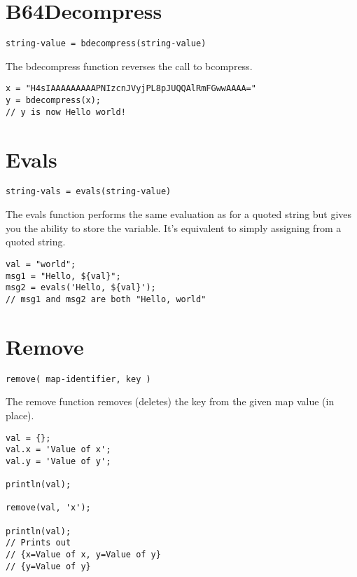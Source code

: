 \section{B64Decompress}
\begin{Verbatim}
string-value = bdecompress(string-value)
\end{Verbatim}

The bdecompress function reverses the call to bcompress.

\begin{lstlisting}[caption={bdecompress example}]
x = "H4sIAAAAAAAAAPNIzcnJVyjPL8pJUQQAlRmFGwwAAAA="
y = bdecompress(x);
// y is now Hello world!

\end{lstlisting}

\section{Evals}
\begin{Verbatim}
string-vals = evals(string-value)
\end{Verbatim}

The evals function performs the same evaluation as for a quoted string but gives you
the ability to store the variable. It's equivalent to simply assigning from a quoted string.

\begin{lstlisting}[caption={evals example}]
val = "world";
msg1 = "Hello, ${val}";
msg2 = evals('Hello, ${val}');
// msg1 and msg2 are both "Hello, world"
\end{lstlisting}

\section{Remove}
\begin{Verbatim}
remove( map-identifier, key )
\end{Verbatim}

The remove function removes (deletes) the key from the given map value (in place).

\begin{lstlisting}[caption={remove example}]
val = {};
val.x = 'Value of x';
val.y = 'Value of y';

println(val);

remove(val, 'x');

println(val);
// Prints out
// {x=Value of x, y=Value of y}
// {y=Value of y}
\end{lstlisting}

